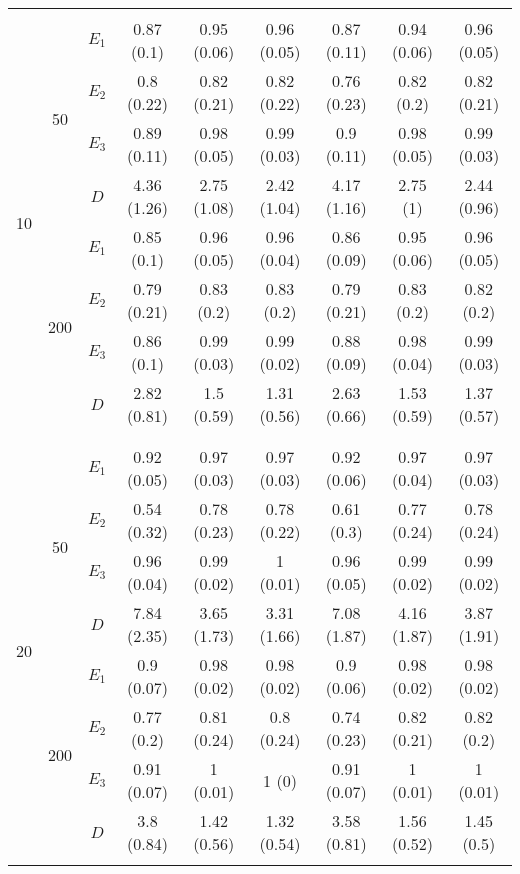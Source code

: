 \begin{table}[htbp]
\begin{tabular}{ccc|ccc|ccc}
  \hline
  \multicolumn{3}{c|}{} & \multicolumn{6}{c}{} \\ 
  \multirow{8}{*}{10} & \multirow{4}{*}{50} & $E_1$ & 0.87 (0.1) & 0.95 (0.06) & 0.96 (0.05) & 0.87 (0.11) & 0.94 (0.06) & 0.96 (0.05) \\ 
  & & $E_2$ & 0.8 (0.22) & 0.82 (0.21) & 0.82 (0.22) & 0.76 (0.23) & 0.82 (0.2) & 0.82 (0.21) \\ 
  & & $E_3$ & 0.89 (0.11) & 0.98 (0.05) & 0.99 (0.03) & 0.9 (0.11) & 0.98 (0.05) & 0.99 (0.03) \\ 
  & & $D$ & 4.36 (1.26) & 2.75 (1.08) & 2.42 (1.04) & 4.17 (1.16) & 2.75 (1) & 2.44 (0.96) \\ 
  & \multirow{4}{*}{200} & $E_1$ & 0.85 (0.1) & 0.96 (0.05) & 0.96 (0.04) & 0.86 (0.09) & 0.95 (0.06) & 0.96 (0.05) \\ 
  & & $E_2$ & 0.79 (0.21) & 0.83 (0.2) & 0.83 (0.2) & 0.79 (0.21) & 0.83 (0.2) & 0.82 (0.2) \\ 
  & & $E_3$ & 0.86 (0.1) & 0.99 (0.03) & 0.99 (0.02) & 0.88 (0.09) & 0.98 (0.04) & 0.99 (0.03) \\ 
  & & $D$ & 2.82 (0.81) & 1.5 (0.59) & 1.31 (0.56) & 2.63 (0.66) & 1.53 (0.59) & 1.37 (0.57) \\
  \multicolumn{3}{c|}{} & \multicolumn{6}{c}{} \\  
  \hline
  \multicolumn{3}{c|}{} & \multicolumn{6}{c}{} \\ 
  \multirow{8}{*}{20} & \multirow{4}{*}{50} & $E_1$ & 0.92 (0.05) & 0.97 (0.03) & 0.97 (0.03) & 0.92 (0.06) & 0.97 (0.04) & 0.97 (0.03) \\ 
  & & $E_2$ & 0.54 (0.32) & 0.78 (0.23) & 0.78 (0.22) & 0.61 (0.3) & 0.77 (0.24) & 0.78 (0.24) \\ 
  & & $E_3$ & 0.96 (0.04) & 0.99 (0.02) & 1 (0.01) & 0.96 (0.05) & 0.99 (0.02) & 0.99 (0.02) \\ 
  & & $D$ & 7.84 (2.35) & 3.65 (1.73) & 3.31 (1.66) & 7.08 (1.87) & 4.16 (1.87) & 3.87 (1.91) \\ 
  & \multirow{4}{*}{200} & $E_1$ & 0.9 (0.07) & 0.98 (0.02) & 0.98 (0.02) & 0.9 (0.06) & 0.98 (0.02) & 0.98 (0.02) \\ 
  & & $E_2$ & 0.77 (0.2) & 0.81 (0.24) & 0.8 (0.24) & 0.74 (0.23) & 0.82 (0.21) & 0.82 (0.2) \\ 
  & & $E_3$ & 0.91 (0.07) & 1 (0.01) & 1 (0) & 0.91 (0.07) & 1 (0.01) & 1 (0.01) \\ 
  & & $D$ & 3.8 (0.84) & 1.42 (0.56) & 1.32 (0.54) & 3.58 (0.81) & 1.56 (0.52) & 1.45 (0.5) \\ 
  \multicolumn{3}{c|}{} & \multicolumn{6}{c}{} \\ 
   \hline
\end{tabular}
\label{tab:errorcomp}
\end{table}




